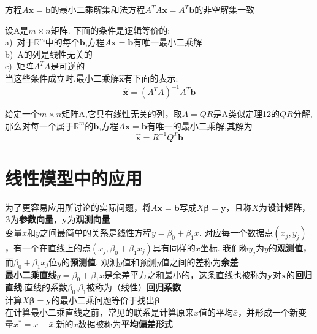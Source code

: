 \begin{TheoremOne}
方程$A\bm{x}=\bm{b}$的最小二乘解集和法方程$A^TA\bm{x}=A^T\bm{b}$的非空解集一致
\end{TheoremOne}\vspace{4ex}

\begin{TheoremOne}
设A是$m\times n$矩阵. 下面的条件是逻辑等价的:\\
a)\ 对于$\mathbb{R}^m$中的每个$\bm{b}$,方程$A\bm{x}=\bm{b}$有唯一最小二乘解\\
b)\ A的列是线性无关的\\
c)\ 矩阵$A^TA$是可逆的\\
当这些条件成立时,最小二乘解$\hat{\bm{x}}$有下面的表示:
\[\hat{\bm{x}}=(A^TA)^{-1}A^T\bm{b}\]
\end{TheoremOne}\vspace{4ex}

\begin{TheoremOne}
给定一个$m\times n$矩阵A,它具有线性无关的列，取$A=QR$是A类似定理12的$QR$分解,那么对每一个属于$\mathbb{R}^m$的$\bm{b}$,方程$A\bm{x}=\bm{b}$有唯一的最小二乘解,其解为
\[\hat{\bm{x}}=R^{-1}Q^T\bm{b}\]
\end{TheoremOne}\vspace{4ex}

\section{线性模型中的应用}
为了更容易应用所讨论的实际问题，将$A\bm{x}=\bm{b}$写成$X\bm{\beta}=\bm{y}$，且称$X$为\textbf{设计矩阵}，$\bm{\beta}$为\textbf{参数向量}，$\bm{y}$为\textbf{观测向量}\\[2ex]

变量$x$和$y$之间最简单的关系是线性方程$y=\beta_0+\beta_1x$. 对应每一个数据点$(x_j,y_j)$，有一个在直线上的点$(x_j,\beta_0+\beta_1x_j)$具有同样的$x$坐标. 我们称$y_j$为$y$的\textbf{观测值}，而$\beta_0+\beta_1x_j$位$y$的\textbf{预测值}. 观测$y$值和预测$y$值之间的差称为\textbf{余差}\\[2ex]

\textbf{最小二乘直线}$y=\beta_0+\beta_1x$是余差平方之和最小的，这条直线也被称为$\bm{y}$对$\bm{x}$的\textbf{回归直线}.直线的系数$\beta_0$,$\beta_1$被称为（线性）\textbf{回归系数}\\[2ex]

计算$X\bm{\beta}=\bm{y}$的最小二乘问题等价于找出$\bm{\beta}$\\[2ex]

在计算最小二乘直线之前，常见的联系是计算原来$x$值的平均$\bar{x}$，并形成一个新变量$x^*=x-\bar{x}$.新的$x$数据被称为\textbf{平均偏差形式}\\[2ex]

